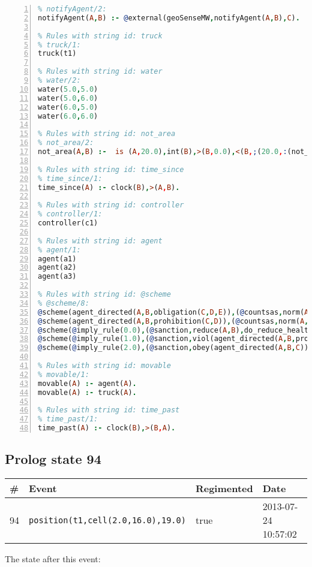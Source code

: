 \documentclass[11pt]{article}\usepackage[utf8]{inputenc}\usepackage{geometry}
\begin{document}
\begin{lstlisting}[language=Prolog, numbers=left]
% Rules with string id: notifyAgent
% notifyAgent/2:
notifyAgent(A,B) :- @external(geoSenseMW,notifyAgent(A,B),C).

% Rules with string id: truck
% truck/1:
truck(t1)

% Rules with string id: water
% water/2:
water(5.0,5.0)
water(5.0,6.0)
water(6.0,5.0)
water(6.0,6.0)

% Rules with string id: not_area
% not_area/2:
not_area(A,B) :-  is (A,20.0),int(B),>(B,0.0),<(B,;(20.0,:(not_area(A,B), is (-(B),20.0)))),int(A),>(A,0.0),<(A,;(20.0,:(area(A,B),-(int(A))))),int(B),>(A,0.0),>(B,0.0),<(A,21.0),<(B,21.0).

% Rules with string id: time_since
% time_since/1:
time_since(A) :- clock(B),>(A,B).

% Rules with string id: controller
% controller/1:
controller(c1)

% Rules with string id: agent
% agent/1:
agent(a1)
agent(a2)
agent(a3)

% Rules with string id: @scheme
% @scheme/8:
@scheme(agent_directed(A,B,obligation(C,D,E)),(@countsas,norm(A,B,F,obligation(C,D,E)),F),false,(listTrue(C)),(time_past(D)),false,[plus(viol(agent_directed(A,B,obligation(C,D,E))))|[]],[plus(obey(agent_directed(A,B,obligation(C,D,E))))|[]])
@scheme(agent_directed(A,B,prohibition(C,D)),(@countsas,norm(A,B,E,prohibition(C,D)),E),(listTrue(C)),false,(false),false,[plus(viol(agent_directed(A,B,prohibition(C,D))))|[]],[plus(obey(agent_directed(A,B,prohibition(C,D))))|[]])
@scheme(@imply_rule(0.0),(@sanction,reduce(A,B),do_reduce_health(A,B),notifyAgent(A,changed(status))),true,false,false,false,[min(reduce(A,B))|[]],[])
@scheme(@imply_rule(1.0),(@sanction,viol(agent_directed(A,B,prohibition(C,D))),do_sanction(D)),true,false,false,false,[min(viol(agent_directed(A,B,prohibition(C,D))))|[]],[])
@scheme(@imply_rule(2.0),(@sanction,obey(agent_directed(A,B,C))),true,false,false,false,[min(obey(agent_directed(A,B,C)))|[]],[])

% Rules with string id: movable
% movable/1:
movable(A) :- agent(A).
movable(A) :- truck(A).

% Rules with string id: time_past
% time_past/1:
time_past(A) :- clock(B),>(B,A).

\end{lstlisting}
\clearpage 
\subsection{Prolog state 94}
\begin{table}[ht]
\centering 
\begin{tabular}{l l l l} 
\textbf{\#} & \textbf{Event} & \textbf{Regimented} & \textbf{Date} \\ [0.5ex] 
\hline
94&\texttt{position(t1,cell(2.0,16.0),19.0)}&true&2013-07-24 10:57:02\\ [1ex] \hline\end{tabular}
\end{table}
The state after this event:
\end{document}
